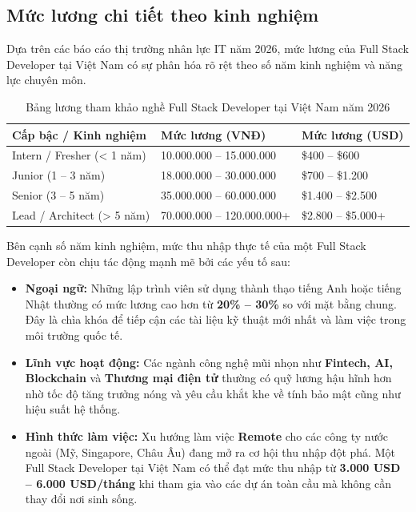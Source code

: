 \documentclass[12pt,a4paper]{article}
\begin{document}
\subsection{Mức lương chi tiết theo kinh nghiệm}

\hspace{0.7cm}Dựa trên các báo cáo thị trường nhân lực IT năm 2026, mức lương của Full Stack Developer tại Việt Nam có sự phân hóa rõ rệt theo số năm kinh nghiệm và năng lực chuyên môn.

\begin{table}[H]
\centering
\renewcommand{\arraystretch}{1.5}
\begin{tabular}{|l|l|l|}
\hline
\textbf{Cấp bậc / Kinh nghiệm} & \textbf{Mức lương (VNĐ)} & \textbf{Mức lương (USD)} \\ \hline
Intern / Fresher (< 1 năm) & 10.000.000 – 15.000.000 & \$400 – \$600 \\ \hline
Junior (1 – 3 năm) & 18.000.000 – 30.000.000 & \$700 – \$1.200 \\ \hline
Senior (3 – 5 năm) & 35.000.000 – 60.000.000 & \$1.400 – \$2.500 \\ \hline
Lead / Architect (> 5 năm) & 70.000.000 – 120.000.000+ & \$2.800 – \$5.000+ \\ \hline
\end{tabular}
\caption{Bảng lương tham khảo nghề Full Stack Developer tại Việt Nam năm 2026}
\end{table}
Bên cạnh số năm kinh nghiệm, mức thu nhập thực tế của một Full Stack Developer 
còn chịu tác động mạnh mẽ bởi các yếu tố sau:

\begin{itemize}
    \item \textbf{Ngoại ngữ:} Những lập trình viên sử dụng thành thạo tiếng Anh hoặc tiếng Nhật thường có mức lương cao hơn từ \textbf{20\% – 30\%} so với mặt bằng chung. Đây là chìa khóa để tiếp cận các tài liệu kỹ thuật mới nhất và làm việc trong môi trường quốc tế.
    \item \textbf{Lĩnh vực hoạt động:} Các ngành công nghệ mũi nhọn như \textbf{Fintech, AI, Blockchain} và \textbf{Thương mại điện tử} thường có quỹ lương hậu hĩnh hơn nhờ tốc độ tăng trưởng nóng và yêu cầu khắt khe về tính bảo mật cũng như hiệu suất hệ thống.
    \item \textbf{Hình thức làm việc:} Xu hướng làm việc \textbf{Remote} cho các công ty nước ngoài (Mỹ, Singapore, Châu Âu) đang mở ra cơ hội thu nhập đột phá. Một Full Stack Developer tại Việt Nam có thể đạt mức thu nhập từ \textbf{3.000 USD – 6.000 USD/tháng} khi tham gia vào các dự án toàn cầu mà không cần thay đổi nơi sinh sống.
\end{itemize}
\end{document}
